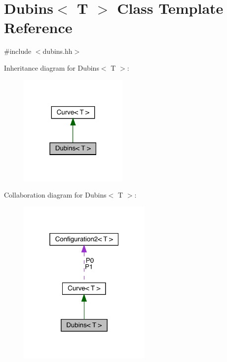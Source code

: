 \hypertarget{class_dubins}{}\section{Dubins$<$ T $>$ Class Template Reference}
\label{class_dubins}


{\ttfamily \#include $<$dubins.\+hh$>$}



Inheritance diagram for Dubins$<$ T $>$\+:
\nopagebreak
\begin{figure}[H]
\begin{center}
\leavevmode
\includegraphics[width=150pt]{class_dubins__inherit__graph}
\end{center}
\end{figure}


Collaboration diagram for Dubins$<$ T $>$\+:
\nopagebreak
\begin{figure}[H]
\begin{center}
\leavevmode
\includegraphics[width=184pt]{class_dubins__coll__graph}
\end{center}
\end{figure}
